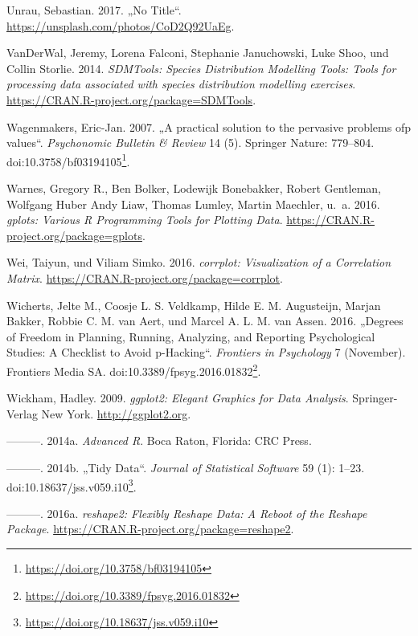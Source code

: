 \documentclass[12pt,ngerman,]{book}
\let\rmarkdownfootnote\footnote%
\def\footnote{\protect\rmarkdownfootnote}
\renewcommand{\href}[2]{#2\footnote{\url{#1}}}
\theoremstyle{definition}
\theoremstyle{definition}
\theoremstyle{remark}
\begin{document}
\hypertarget{ref-unrau1}{}
Unrau, Sebastian. 2017. „No Title``.
\url{https://unsplash.com/photos/CoD2Q92UaEg}.

\hypertarget{ref-R-SDMTools}{}
VanDerWal, Jeremy, Lorena Falconi, Stephanie Januchowski, Luke Shoo, und
Collin Storlie. 2014. \emph{SDMTools: Species Distribution Modelling
Tools: Tools for processing data associated with species distribution
modelling exercises}. \url{https://CRAN.R-project.org/package=SDMTools}.

\hypertarget{ref-Wagenmakers2007}{}
Wagenmakers, Eric-Jan. 2007. „A practical solution to the pervasive
problems ofp values``. \emph{Psychonomic Bulletin \& Review} 14 (5).
Springer Nature: 779--804.
doi:\href{https://doi.org/10.3758/bf03194105}{10.3758/bf03194105}.

\hypertarget{ref-R-gplots}{}
Warnes, Gregory R., Ben Bolker, Lodewijk Bonebakker, Robert Gentleman,
Wolfgang Huber Andy Liaw, Thomas Lumley, Martin Maechler, u.~a. 2016.
\emph{gplots: Various R Programming Tools for Plotting Data}.
\url{https://CRAN.R-project.org/package=gplots}.

\hypertarget{ref-R-corrplot}{}
Wei, Taiyun, und Viliam Simko. 2016. \emph{corrplot: Visualization of a
Correlation Matrix}. \url{https://CRAN.R-project.org/package=corrplot}.

\hypertarget{ref-Wicherts2016}{}
Wicherts, Jelte M., Coosje L. S. Veldkamp, Hilde E. M. Augusteijn,
Marjan Bakker, Robbie C. M. van Aert, und Marcel A. L. M. van Assen.
2016. „Degrees of Freedom in Planning, Running, Analyzing, and Reporting
Psychological Studies: A Checklist to Avoid p-Hacking``. \emph{Frontiers
in Psychology} 7 (November). Frontiers Media SA.
doi:\href{https://doi.org/10.3389/fpsyg.2016.01832}{10.3389/fpsyg.2016.01832}.

\hypertarget{ref-R-ggplot2}{}
Wickham, Hadley. 2009. \emph{ggplot2: Elegant Graphics for Data
Analysis}. Springer-Verlag New York. \url{http://ggplot2.org}.

\hypertarget{ref-wickham2014advanced}{}
---------. 2014a. \emph{Advanced R}. Boca Raton, Florida: CRC Press.

\hypertarget{ref-tidydata}{}
---------. 2014b. „Tidy Data``. \emph{Journal of Statistical Software}
59 (1): 1--23.
doi:\href{https://doi.org/10.18637/jss.v059.i10}{10.18637/jss.v059.i10}.

\hypertarget{ref-R-reshape2}{}
---------. 2016a. \emph{reshape2: Flexibly Reshape Data: A Reboot of the
Reshape Package}. \url{https://CRAN.R-project.org/package=reshape2}.
\end{document}
